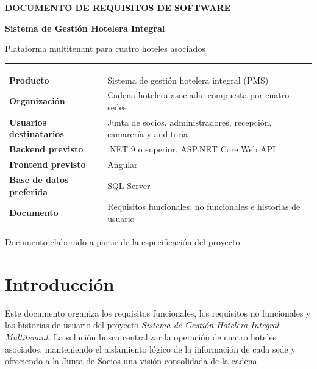\documentclass[12pt,a4paper]{article}
\begin{document}
\begin{titlepage}
  \centering
  \vspace*{2cm}
  {\Large\bfseries DOCUMENTO DE REQUISITOS DE SOFTWARE\par}
  \vspace{0.8cm}
  {\huge\bfseries Sistema de Gestión Hotelera Integral\par}
  \vspace{0.3cm}
  {\Large Plataforma multitenant para cuatro hoteles asociados\par}
  \vspace{1.5cm}
  \color{azulhotel}\rule{0.85\textwidth}{1.2pt}
  \vspace{1cm}

  \begin{tabular}{>{\bfseries}p{4cm} p{8cm}}
    Producto & Sistema de gestión hotelera integral (PMS)\\
    Organización & Cadena hotelera asociada, compuesta por cuatro sedes\\
    Usuarios destinatarios & Junta de socios, administradores, recepción, camarería y auditoría\\
    Backend previsto & .NET 9 o superior, ASP.NET Core Web API\\
    Frontend previsto & Angular\\
    Base de datos preferida & SQL Server\\
    Documento & Requisitos funcionales, no funcionales e historias de usuario\\
  \end{tabular}

  \vfill
  {\large Documento elaborado a partir de la especificación del proyecto\par}
\end{titlepage}

\tableofcontents
\newpage

\section{Introducción}

Este documento organiza los requisitos funcionales, los requisitos no funcionales y las historias de usuario del proyecto \textit{Sistema de Gestión Hotelera Integral Multitenant}. La solución busca centralizar la operación de cuatro hoteles asociados, manteniendo el aislamiento lógico de la información de cada sede y ofreciendo a la Junta de Socios una visión consolidada de la cadena.
\end{document}
